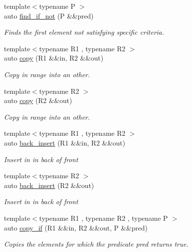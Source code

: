 \begin{DoxyCompactItemize}
{\footnotesize template$<$typename P $>$ }\\auto \mbox{\hyperlink{namespacerah_a406c37a2cf758e7329bfd696a6bf8f89}{find\+\_\+if\+\_\+not}} (P \&\&pred)
\begin{DoxyCompactList}\small\item\em Finds the first element not satisfying specific criteria. \end{DoxyCompactList}\item 
{\footnotesize template$<$typename R1 , typename R2 $>$ }\\auto \mbox{\hyperlink{namespacerah_a1d0f36ff683cedc9090956ea389b3312}{copy}} (R1 \&\&in, R2 \&\&out)
\begin{DoxyCompactList}\small\item\em Copy in range into an other. \end{DoxyCompactList}\item 
{\footnotesize template$<$typename R2 $>$ }\\auto \mbox{\hyperlink{namespacerah_ab3873d79b7f878223f24062ba562eba9}{copy}} (R2 \&\&out)
\begin{DoxyCompactList}\small\item\em Copy in range into an other. \end{DoxyCompactList}\item 
{\footnotesize template$<$typename R1 , typename R2 $>$ }\\auto \mbox{\hyperlink{namespacerah_a2734b7f57efb773c6df8ac55b9d040cd}{back\+\_\+insert}} (R1 \&\&in, R2 \&\&out)
\begin{DoxyCompactList}\small\item\em Insert {\itshape in} in back of {\itshape front} \end{DoxyCompactList}\item 
{\footnotesize template$<$typename R2 $>$ }\\auto \mbox{\hyperlink{namespacerah_a1c3ab6d88fc54b3638ef699d465e86b4}{back\+\_\+insert}} (R2 \&\&out)
\begin{DoxyCompactList}\small\item\em Insert {\itshape in} in back of {\itshape front} \end{DoxyCompactList}\item 
{\footnotesize template$<$typename R1 , typename R2 , typename P $>$ }\\auto \mbox{\hyperlink{namespacerah_a550a133fe8c6de600a83959c82a0c592}{copy\+\_\+if}} (R1 \&\&in, R2 \&\&out, P \&\&pred)
\begin{DoxyCompactList}\small\item\em Copies the elements for which the predicate pred returns true. \end{DoxyCompactList}\item 

\end{DoxyCompactItemize}
